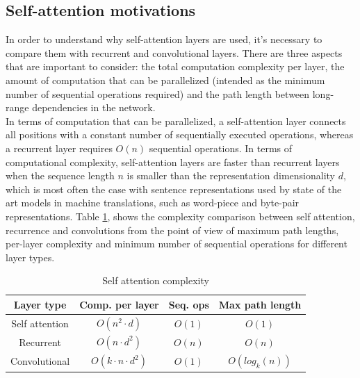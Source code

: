 \documentclass[\main/main.tex]{subfiles}
\begin{document}
\subsection{Self-attention motivations}
In order to understand why self-attention layers are used, it's necessary to compare them with recurrent and convolutional layers. There are three aspects that are important to consider: the total computation complexity per layer, the amount of computation that can be parallelized (intended as the minimum number of sequential operations required) and the path length between long-range dependencies in the network. \\
In terms of computation that can be parallelized, a self-attention layer connects all positions with a constant number of sequentially executed operations, whereas a recurrent layer requires $O(n)$ sequential operations. In terms of computational complexity, self-attention layers are faster than recurrent layers when the sequence length $n$ is smaller than the representation dimensionality $d$, which is most often the case with sentence representations used by state of the art models in machine translations, such as word-piece and byte-pair representations. Table \ref{table:complexity_self_attention}, shows the complexity comparison between self attention, recurrence and convolutions from the point of view of maximum path lengths, per-layer complexity and minimum number of sequential operations for different layer types. 

\begin{table}[H]
\centering
\begin{tabular}{||c c c c||} 
 \hline
 Layer type & Comp. per layer & Seq. ops & Max path length \\ [0.5ex] 
 \hline\hline
 Self attention & $O(n^2 \cdot d)$ & $O(1)$ & $O(1)$ \\ 
 \hline
 Recurrent & $O(n \cdot d^2)$ & $O(n)$ & $O(n)$ \\
 \hline
 Convolutional & $O(k \cdot n \cdot d^2)$ & $O(1)$ & $O(log_k(n))$ \\
 \hline
 
\end{tabular}
\caption{Self attention complexity}
 \label{table:complexity_self_attention}
\end{table}
\end{document}
